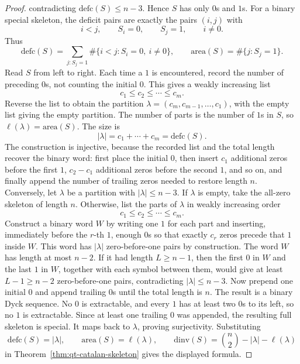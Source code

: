 \documentclass[11pt]{article}
\theoremstyle{plain}
\theoremstyle{definition}
\theoremstyle{remark}
\newcommand{\dinv}{\mathrm{dinv}}
\newcommand{\area}{\mathrm{area}}
\newcommand{\defc}{\mathrm{defc}}
\begin{document}
\begin{proof}
contradicting \(\defc(S)\le n-3\).  Hence \(S\) has only \(0\)s and \(1\)s.
For a binary special skeleton, the deficit pairs are exactly the pairs
\((i,j)\) with
\[
  i<j,
  \qquad
  S_i=0,
  \qquad
  S_j=1,
  \qquad
  i\ne 0.
\]
Thus
\[
  \defc(S)=
  \sum_{j:S_j=1}\#\{i<j:S_i=0,\ i\ne 0\},
  \qquad
  \area(S)=\#\{j:S_j=1\}.
\]
Read \(S\) from left to right.  Each time a \(1\) is encountered, record the
number of preceding \(0\)s, not counting the initial \(0\).  This gives a
weakly increasing list
\[
  c_1\le c_2\le\cdots\le c_m.
\]
Reverse the list to obtain the partition
\(\lambda=(c_m,c_{m-1},\ldots,c_1)\), with the empty list giving the empty
partition.  The number of parts is the number of \(1\)s in \(S\), so
\(\ell(\lambda)=\area(S)\).  The size is
\[
  |\lambda|=c_1+\cdots+c_m=\defc(S).
\]
The construction is injective, because the recorded list and the total length
recover the binary word: first place the initial \(0\), then insert \(c_1\)
additional zeros before the first \(1\), \(c_2-c_1\) additional zeros before the
second \(1\), and so on, and finally append the number of trailing zeros needed
to restore length \(n\).
Conversely, let \(\lambda\) be a partition with \(|\lambda|\le n-3\).  If
\(\lambda\) is empty, take the all-zero skeleton of length \(n\).  Otherwise,
list the parts of \(\lambda\) in weakly increasing order
\[
  c_1\le c_2\le\cdots\le c_m.
\]
Construct a binary word \(W\) by writing one \(1\) for each part and inserting,
immediately before the \(r\)-th \(1\), enough \(0\)s so that exactly \(c_r\)
zeros precede that \(1\) inside \(W\).  This word has \(|\lambda|\) zero-before-one
pairs by construction.
The word \(W\) has length at most \(n-2\).  If it had length \(L\ge n-1\), then
the first \(0\) in \(W\) and the last \(1\) in \(W\), together with each symbol
between them, would give at least \(L-1\ge n-2\) zero-before-one pairs,
contradicting \(|\lambda|\le n-3\).  Now prepend one initial \(0\) and append
trailing \(0\)s until the total length is \(n\).  The result is a binary Dyck
sequence.  No \(0\) is extractable, and every \(1\) has at least two \(0\)s to
its left, so no \(1\) is extractable.  Since at least one trailing \(0\) was
appended, the resulting full skeleton is special.  It maps back to
\(\lambda\), proving surjectivity.
Substituting
\[
  \defc(S)=|\lambda|,
  \qquad
  \area(S)=\ell(\lambda),
  \qquad
  \dinv(S)=\binom n2-|\lambda|-\ell(\lambda)
\]
in Theorem~\ref{thm:qt-catalan-skeleton} gives the displayed formula.
\end{proof}
\end{document}
